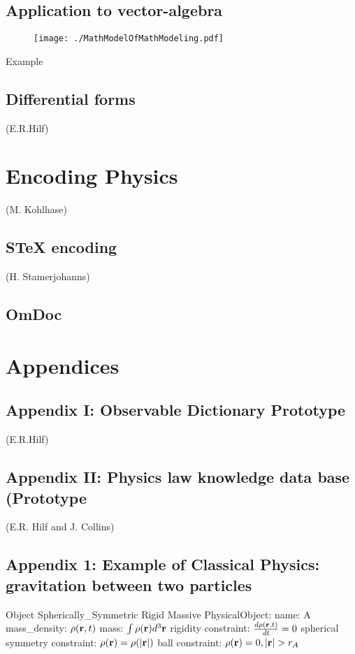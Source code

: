 \documentclass[12pt]{article}
\begin{document}
\subsection{Application to vector-algebra}
\begin{figure}
  \begin{center} %
    \texttt{[image: ./MathModelOfMathModeling.pdf]}
  \end{center}
\end{figure}
Example
\subsection{Differential forms}
(E.R.Hilf)

\section{Encoding Physics }
(M. Kohlhase)
\subsection{STeX encoding}
(H. Stamerjohanns)
\subsection{OmDoc}
\section{Appendices}
\subsection{Appendix I: Observable Dictionary Prototype}
(E.R.Hilf)
\subsection{Appendix II: Physics law knowledge data base (Prototype}
(E.R. Hilf and J. Collins)
\subsection{Appendix 1: Example of Classical Physics: gravitation
  between two particles}

Object
Spherically_Symmetric Rigid Massive PhysicalObject:
name: A
mass_density: $\rho({\bf r}, t)$
mass: $\int \rho({\bf r}) d^3{\bf r}$
rigidity constraint: ${{d \rho({\bf r}, t)}\over{dt}} = 0$
spherical symmetry constraint: $\rho({\bf r}) = \rho(\left|{\bf r}\right|)$
ball constraint:  $\rho({\bf r}) = 0, \left|{\bf r}\right|>r_A$
\end{document}
